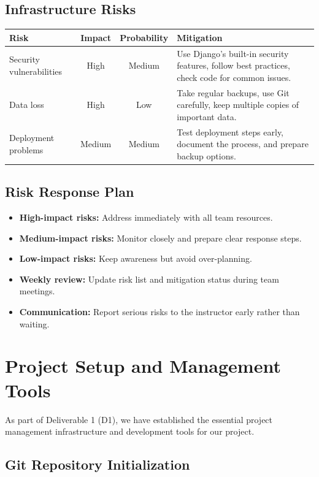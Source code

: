 \documentclass[12pt,a4paper]{article}
\newcommand{\sectionbreak}{\vspace{0.5cm}}
\begin{document}
\subsection{Infrastructure Risks}
\begin{tabularx}{\textwidth}{|X|c|c|X|}
\hline
\textbf{Risk} & \textbf{Impact} & \textbf{Probability} & \textbf{Mitigation} \\
\hline
Security vulnerabilities & High & Medium & Use Django’s built-in security features, follow best practices, check code for common issues. \\
\hline
Data loss & High & Low & Take regular backups, use Git carefully, keep multiple copies of important data. \\
\hline
Deployment problems & Medium & Medium & Test deployment steps early, document the process, and prepare backup options. \\
\hline
\end{tabularx}

\subsection{Risk Response Plan}
\begin{itemize}
    \item \textbf{High-impact risks:} Address immediately with all team resources.
    \item \textbf{Medium-impact risks:} Monitor closely and prepare clear response steps.
    \item \textbf{Low-impact risks:} Keep awareness but avoid over-planning.
    \item \textbf{Weekly review:} Update risk list and mitigation status during team meetings.
    \item \textbf{Communication:} Report serious risks to the instructor early rather than waiting.
\end{itemize}


\sectionbreak




\section{Project Setup and Management Tools}

As part of Deliverable 1 (D1), we have established the essential project management infrastructure and development tools for our project.

\subsection{Git Repository Initialization}
\end{document}
